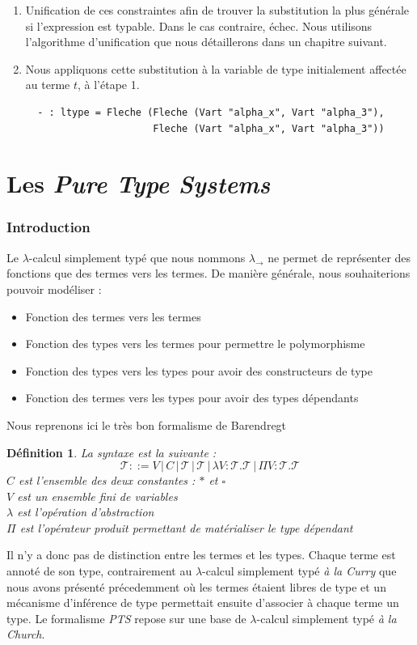 \documentclass[11pt]{book}
\newtheorem{definition}{Définition}
\begin{document}
\begin{enumerate}
  \item Unification de ces constraintes afin de trouver la substitution la plus générale si l'expression est typable. 
  Dans le cas contraire, échec. Nous utilisons l'algorithme d'unification que nous détaillerons dans un chapitre suivant.

  \item Nous appliquons cette substitution à la variable de type initialement affectée au terme $t$, à l'étape 1.
\begin{Verbatim}
  - : ltype = Fleche (Fleche (Vart "alpha_x", Vart "alpha_3"),
                      Fleche (Vart "alpha_x", Vart "alpha_3"))
\end{Verbatim}
\end{enumerate}

\section{Les \textit{Pure Type Systems}}
  \subsubsection{Introduction}
Le $\lambda$-calcul simplement typé que nous nommons $\lambda _\rightarrow$ ne permet
de représenter des fonctions que des termes vers les termes. De manière générale, nous souhaiterions
pouvoir modéliser :
\begin{itemize}
  \item Fonction des termes vers les termes 
  \item Fonction des types vers les termes pour permettre le polymorphisme
  \item Fonction des types vers les types pour avoir des constructeurs de type 
  \item Fonction des termes vers les types pour avoir des types dépendants
\end{itemize}
Nous reprenons ici le très bon formalisme de Barendregt \cite{baren}
\begin{definition}
  La syntaxe est la suivante :
  $$ \mathcal{T} ::= V \,|\, C \,|\,\mathcal{T} \,| \,\mathcal{T} 
  \,|\, \lambda V:\mathcal{T}.\mathcal{T} \,|\, \Pi V : \mathcal{T}.\mathcal{T}
  $$
  $C$ est l'ensemble des deux constantes : $*$ et $\square$ \\
  $V$ est un ensemble fini de variables \\
  $\lambda$ est l'opération d'abstraction \\
  $\Pi$ est l'opérateur produit permettant de matérialiser le type dépendant 
\end{definition}
Il n'y a donc pas de distinction entre les termes et les types.
Chaque terme est annoté de son type, contrairement au $\lambda$-calcul simplement typé 
\textit{à la Curry} que nous
avons présenté précedemment où les termes étaient libres de type et un mécanisme d'inférence de 
type permettait ensuite d'associer à chaque terme un type.
Le formalisme \textit{PTS} repose sur une base de  $\lambda$-calcul simplement typé 
\textit{à la Church}.
\end{document}
